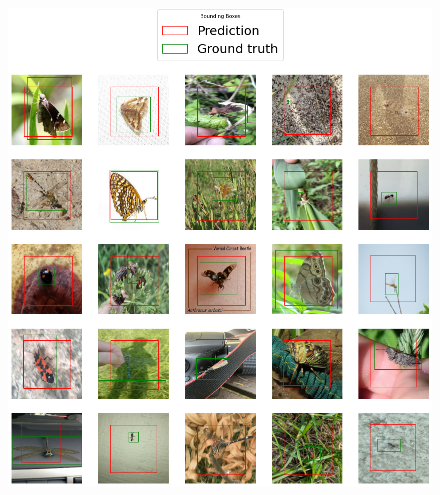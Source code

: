 
\begin{figure}
    \centering
    \vspace{-25pt}
    \begin{multicols}{2}
        \begin{minipage}{.45\textwidth}
            \includegraphics[width=\textwidth]{images/regression-inet.png}
        \end{minipage}
        \columnbreak
        \begin{minipage}{.45\textwidth}

\end{minipage}
\end{multicols}
\end{figure}
